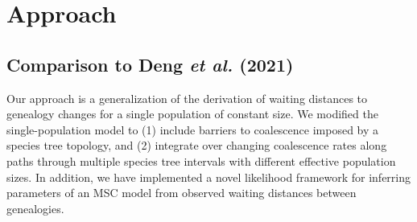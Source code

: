 \documentclass[11pt]{article}
\begin{document}














\section{Approach}
\subsection{Comparison to Deng \emph{et al.} (2021)} %

Our approach is a generalization of the \citet{deng_distribution_2021} derivation 
of waiting distances to genealogy changes for a single population of constant size. 
We modified the single-population model to (1) include barriers to coalescence imposed
by a species tree topology, and (2) integrate over changing coalescence rates along
paths through multiple species tree intervals with different effective population 
sizes. In addition, we have implemented a novel likelihood framework for inferring 
parameters of an MSC model from observed waiting distances between genealogies.
\end{document}
